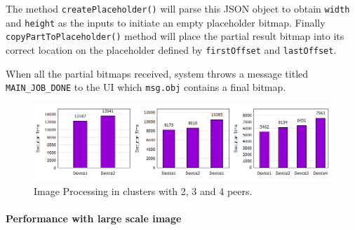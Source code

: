 \documentclass[conference]{IEEEtran}
\begin{document}
\noindent {}

The method \texttt{createPlaceholder()} will parse this JSON object to obtain \texttt{width} and \texttt{height} as the inputs to initiate an empty placeholder bitmap. Finally \texttt{copyPartToPlaceholder()} method will place the partial result bitmap into its correct location on the placeholder defined by \texttt{firstOffset} and \texttt{lastOffset}.\\

\noindent {}

When all the partial bitmaps received, system throws a message titled \texttt{MAIN\_JOB\_DONE} to the UI which \texttt{msg.obj} contains a final bitmap.

\begin{figure}[!hbt]
  \includegraphics[width=1\textwidth, natwidth=918, natheight=239]{data/c_all}
  \caption{Image Processing in clusters with 2, 3 and 4 peers.}
	\label{fig:cluster_234}
\end{figure}

\paragraph{Performance with large scale image}
\end{document}
